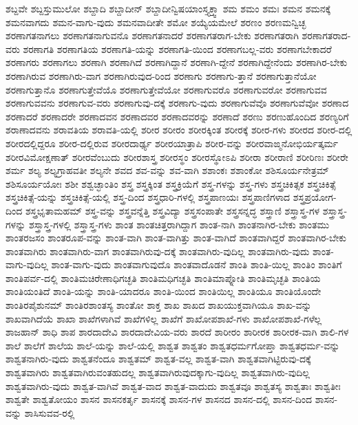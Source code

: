 {ಶಬ್ದವೇ
ಶಬ್ದಸ್ತುಮುಲೋ
ಶಬ್ದಾದಿ
ಶಬ್ದಾದೀನ್
ಶಬ್ದಾದೀನ್ವಿಷಯಾಂಸ್ತ್ಯಕ್ತ್ವಾ
ಶಮ
ಶಮಂ
ಶಮಃ
ಶಮನ
ಶಮನಕ್ಕೆ
ಶಮನವಾಗದು
ಶಮನ-ವಾಗು-ವುದು
ಶಮನವಾದೀತೇ
ಶಮೋ
ಶಯ್ಯೆಯಮೇಲೆ
ಶರಣಂ
ಶರಣಮನ್ವಿಚ್ಛ
ಶರಣಾಗತನಾಗಲು
ಶರಣಾಗತನಾಗುವನೊ
ಶರಣಾಗತನಾದರೆ
ಶರಣಾಗತರಾಗ-ಬೇಕು
ಶರಣಾಗತರಾಗಿ
ಶರಣಾಗತರಾದ-ವರು
ಶರಣಾಗತಿ
ಶರಣಾಗತಿಯ
ಶರಣಾಗತಿ-ಯನ್ನು
ಶರಣಾಗತಿ-ಯಿಂದ
ಶರಣಾಗಬಲ್ಲ-ವರು
ಶರಣಾಗಬೇಕಾದರೆ
ಶರಣಾಗರು
ಶರಣಾಗಲು
ಶರಣಾಗಿ
ಶರಣಾಗಿದೆ
ಶರಣಾಗಿದ್ದಾನೆ
ಶರಣಾಗಿ-ದ್ದೇನೆ
ಶರಣಾಗಿದ್ದೇನೆಂದು
ಶರಣಾಗಿರ-ಬೇಕು
ಶರಣಾಗಿರುವ
ಶರಣಾಗಿರು-ವಾಗ
ಶರಣಾಗಿರುವುದ-ರಿಂದ
ಶರಣಾಗು
ಶರಣಾಗು-ತ್ತಾನೆ
ಶರಣಾಗುತ್ತಾನೆಯೋ
ಶರಣಾಗುತ್ತಾನೊ
ಶರಣಾಗುತ್ತೇವೆಯೊ
ಶರಣಾಗುತ್ತೇವೆಯೋ
ಶರಣಾಗುವರೊ
ಶರಣಾಗುವರೋ
ಶರಣಾಗುವವ
ಶರಣಾಗುವವನು
ಶರಣಾಗುವ-ವರು
ಶರಣಾಗುವು-ದಕ್ಕೆ
ಶರಣಾಗು-ವುದು
ಶರಣಾಗುವೆವೊ
ಶರಣಾಗುವೆವೋ
ಶರಣಾದ
ಶರಣಾದರೆ
ಶರಣಾದರೇ
ಶರಣಾದವನ
ಶರಣಾದವರ
ಶರಣಾದವರನ್ನು
ಶರಣಾದೆ
ಶರಣು
ಶರಣುಹೊಂದಿದ
ಶರಣ್ಯರಿಗೆ
ಶರಾಣಾದವನು
ಶರಾವತಿಯ
ಶರಾವತಿ-ಯಲ್ಲಿ
ಶರೀರ
ಶರೀರಂ
ಶರೀರಕ್ಕಿಂತ
ಶರೀರಕ್ಕೆ
ಶರೀರ-ಗಳು
ಶರೀರದ
ಶರೀರ-ದಲ್ಲಿ
ಶರೀರದಲ್ಲಿದ್ದರೂ
ಶರೀರ-ದಲ್ಲಿರುವ
ಶರೀರದಾರ್ಢ್ಯ
ಶರೀರಯಾತ್ರಾಪಿ
ಶರೀರ-ವನ್ನು
ಶರೀರವಾಙ್ಮನೋಭಿರ್ಯತ್ಕರ್ಮ
ಶರೀರವಿಮೋಕ್ಷಣಾತ್
ಶರೀರವೆಂಬುದು
ಶರೀರಶಾಸ್ತ್ರ
ಶರೀರಸ್ಥಂ
ಶರೀರಸ್ಥೋಽಪಿ
ಶರೀರಾ
ಶರೀರಾಣಿ
ಶರೀರಿಣಃ
ಶರೀರೇ
ಶರ್ಮ
ಶಲ್ಯ
ಶಲ್ಯಗ್ರಾಹವತೀ
ಶಲ್ಯನೇ
ಶವದ
ಶವ-ವನ್ನು
ಶವ-ವಾಗಿ
ಶಶಾಂಕಃ
ಶಶಾಂಕೋ
ಶಶಿಸೂರ್ಯನೇತ್ರಮ್
ಶಶಿಸೂರ್ಯಯೋಃ
ಶಶೀ
ಶಶ್ವಚ್ಛಾಂತಿಂ
ಶಸ್ತ್ರ
ಶಸ್ತ್ರಕ್ಕಿಂತ
ಶಸ್ತ್ರಕ್ರಿಯೆಗೆ
ಶಸ್ತ್ರ-ಗಳನ್ನು
ಶಸ್ತ್ರ-ಗಳು
ಶಸ್ತ್ರಚಿಕಿತ್ಸಕ
ಶಸ್ತ್ರಚಿಕಿತ್ಸೆ
ಶಸ್ತ್ರಚಿಕಿತ್ಸೆ-ಯನ್ನು
ಶಸ್ತ್ರಚಿಕಿತ್ಸೆ-ಯಲ್ಲಿ
ಶಸ್ತ್ರ-ದಿಂದ
ಶಸ್ತ್ರಧಾರಿ-ಗಳಲ್ಲಿ
ಶಸ್ತ್ರಪಾಣಯಃ
ಶಸ್ತ್ರಪಾಣಿಗಳಾದ
ಶಸ್ತ್ರಪ್ರಯೋಗ-ದಿಂದ
ಶಸ್ತ್ರಭೃತಾಮಹಮ್
ಶಸ್ತ್ರ-ವನ್ನು
ಶಸ್ತ್ರವನ್ನೆತ್ತಿ
ಶಸ್ತ್ರವಿದ್ಯಾ
ಶಸ್ತ್ರಸಂಪಾತೇ
ಶಸ್ತ್ರಸನ್ನದ್ಧ
ಶಸ್ತ್ರಾಣಿ
ಶಸ್ತ್ರಾಸ್ತ್ರ-ಗಳ
ಶಸ್ತ್ರಾಸ್ತ್ರ-ಗಳನ್ನು
ಶಸ್ತ್ರಾಸ್ತ್ರ-ಗಳಲ್ಲಿ
ಶಸ್ತ್ರಾಸ್ತ್ರ-ಗಳು
ಶಾಂತ
ಶಾಂತಚಿತ್ತರಾಗಿದ್ದಾಗ
ಶಾಂತ-ನಾಗಿ
ಶಾಂತನಾಗಿರ-ಬೇಕು
ಶಾಂತಮು
ಶಾಂತರಜಸಂ
ಶಾಂತರೂಪ-ವನ್ನು
ಶಾಂತ-ವಾಗಿ
ಶಾಂತ-ವಾಗಿತ್ತು
ಶಾಂತ-ವಾಗಿದೆ
ಶಾಂತವಾಗಿದ್ದರೆ
ಶಾಂತವಾಗಿರ-ಬೇಕು
ಶಾಂತವಾಗಿರು
ಶಾಂತವಾಗಿರು-ವಾಗ
ಶಾಂತವಾಗಿರುವು-ದಕ್ಕೆ
ಶಾಂತವಾಗಿರು-ವುದಿಲ್ಲ
ಶಾಂತವಾಗಿರು-ವುದು
ಶಾಂತ-ವಾಗು-ವುದಿಲ್ಲ
ಶಾಂತ-ವಾಗು-ವುದು
ಶಾಂತವಾಗುವುದೊ
ಶಾಂತವಾದೊಡನೆ
ಶಾಂತಿ
ಶಾಂತಿ-ಯಿಲ್ಲ
ಶಾಂತಿಂ
ಶಾಂತಿಗೆ
ಶಾಂತಿಪರ್ವ-ದಲ್ಲಿ
ಶಾಂತಿಮಚಿರೇಣಾಧಿಗಚ್ಛತಿ
ಶಾಂತಿಮಧಿಗಚ್ಛತಿ
ಶಾಂತಿಮಾಪ್ನೋತಿ
ಶಾಂತಿಮೃಚ್ಛತಿ
ಶಾಂತಿಯ
ಶಾಂತಿಯಂತಿದೆ
ಶಾಂತಿ-ಯನ್ನು
ಶಾಂತಿ-ಯಾದರೂ
ಶಾಂತಿ-ಯಿಂದ
ಶಾಂತಿಯಿಲ್ಲ
ಶಾಂತಿಯೂ
ಶಾಂತಿಯೊಂದೇ
ಶಾಂತಿರಪೈಶುನಮ್
ಶಾಂತಿರಶಾಂತಸ್ಯ
ಶಾಂತೋ
ಶಾಕ್ತ
ಶಾಖ
ಶಾಖದ
ಶಾಖಯುಕ್ತವಾಗಿಯೂ
ಶಾಖ-ವನ್ನು
ಶಾಖವಾಗಿದೆಯೆ
ಶಾಖಾ
ಶಾಖೆಗಳಾಗಿವೆ
ಶಾಖೆಗಳಿಲ್ಲ
ಶಾಖೆಗೆ
ಶಾಖೋಪಶಾಖೆ-ಗಳು
ಶಾಖೋಪಶಾಖೆ-ಗಳೆಲ್ಲ
ಶಾಜಹಾನ್
ಶಾಧಿ
ಶಾಪ
ಶಾರದಾದೇವಿ
ಶಾರದಾದೇವಿಯ-ವರು
ಶಾರದೆ
ಶಾರೀರಂ
ಶಾರೀರಕ
ಶಾರೀರಕ-ವಾಗಿ
ಶಾಲಿ-ಗಳ
ಶಾಲೆ
ಶಾಲೆಗೆ
ಶಾಲೆಯ
ಶಾಲೆ-ಯನ್ನು
ಶಾಲೆ-ಯಲ್ಲಿ
ಶಾಶ್ವತ
ಶಾಶ್ವತಂ
ಶಾಶ್ವತಧರ್ಮಗೋಪ್ತಾ
ಶಾಶ್ವತಧರ್ಮ-ವನ್ನು
ಶಾಶ್ವತನಾಗಿರು-ವುದು
ಶಾಶ್ವತನೆಂದೂ
ಶಾಶ್ವತಮ್
ಶಾಶ್ವತ-ವಲ್ಲ
ಶಾಶ್ವತ-ವಾಗಿ
ಶಾಶ್ವತವಾಗಿಟ್ಟಿರುವು-ದಕ್ಕೆ
ಶಾಶ್ವತವಾಗಿರು
ಶಾಶ್ವತವಾಗಿರುವಂತಹುದಲ್ಲ
ಶಾಶ್ವತವಾಗಿರುವುದಕ್ಕಾಗು-ವುದಿಲ್ಲ
ಶಾಶ್ವತವಾಗಿರು-ವುದಿಲ್ಲ
ಶಾಶ್ವತವಾಗಿರು-ವುದು
ಶಾಶ್ವತ-ವಾಗಿವೆ
ಶಾಶ್ವತ-ವಾದ
ಶಾಶ್ವತ-ವಾದುದು
ಶಾಶ್ವತವೂ
ಶಾಶ್ವತಸ್ಯ
ಶಾಶ್ವತಾಃ
ಶಾಶ್ವತೀಃ
ಶಾಶ್ವತೇ
ಶಾಶ್ವತೋಯಂ
ಶಾಸನ
ಶಾಸನಕರ್ತೃ
ಶಾಸನಕ್ಕೆ
ಶಾಸನ-ಗಳ
ಶಾಸನದ
ಶಾಸನ-ದಲ್ಲಿ
ಶಾಸನ-ದಿಂದ
ಶಾಸನ-ವನ್ನು
ಶಾಸಿಸುವವ-ರಲ್ಲಿ
}
